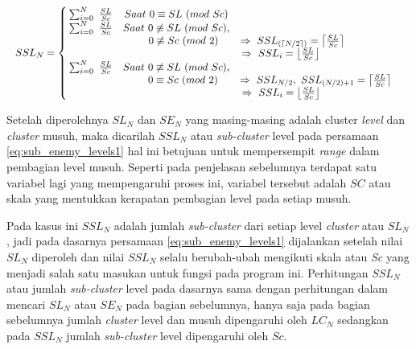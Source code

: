 \begin{equation}\label{eq:sub_enemy_levels1}
\resizebox{\columnwidth}{!}{%
	$SSL_{N} = \left\{\begin{matrix}
	\hspace{0.2em} \sum_{i = 0}^{N}\ \frac{SL}{Sc} & Saat\ 0 \equiv SL\ (mod\ Sc) & \\
	
	\hspace{0.2em} \sum_{i = 0}^{N}\ \frac{SL}{Sc} & Saat\ 0 \not\equiv SL\ (mod\ Sc), & \\
	&\hspace{1.4em}  0 \not\equiv Sc\ (mod\ 2) & \hspace{-4.5em} \Rightarrow\ SSL_{(\left \lceil N/2 \right \rceil)}  = \left \lceil \frac{SL}{Sc} \right \rceil &\\
	
	& & \hspace{-6.8em} \Rightarrow\ SSL_{i}  = \left \lfloor \frac{SL}{Sc} \right \rfloor &\\
	
	\hspace{0.2em} \sum_{i = 0}^{N}\ \frac{SL}{Sc} & Saat\ 0 \not\equiv SL\ (mod\ Sc), & \\
	&\hspace{1.3em}  0 \equiv Sc\ (mod\ 2) & \Rightarrow\ SSL_{N/2},\ SSL_{(N/2) + 1}  = \left \lceil \frac{SL}{Sc} \right \rceil &\\
	
	& & \hspace{-6.7em} \Rightarrow\ SSL_{i}  = \left \lfloor \frac{SL}{Sc} \right \rfloor &\\
	\end{matrix}\right.$%
}
\end{equation}

Setelah diperolehnya $SL_{N}$ dan $SE_{N}$ yang masing-masing adalah cluster \textit{level} dan \textit{cluster} musuh, maka dicarilah $SSL_{N}$ atau \textit{sub-cluster} level pada persamaan \ref{eq:sub_enemy_levels1} hal ini betujuan untuk mempersempit \textit{range} dalam pembagian level musuh. Seperti pada penjelasan sebelumnya terdapat satu variabel lagi yang mempengaruhi proses ini, variabel tersebut adalah $SC$ atau skala yang mentukkan kerapatan pembagian level pada setiap musuh. 
\vspace{1ex}

Pada kasus ini $SSL_{N}$ adalah jumlah \textit{sub-cluster} dari setiap level \textit{cluster} atau $SL_{N}$, jadi pada dasarnya persamaan \ref{eq:sub_enemy_levels1} dijalankan setelah nilai $SL_{N}$ diperoleh dan nilai $SSL_{N}$ selalu berubah-ubah mengikuti skala atau \textit{Sc} yang menjadi salah satu masukan untuk fungsi pada program ini. Perhitungan $SSL_{N}$ atau jumlah \textit{sub-cluster} level pada dasarnya sama dengan perhitungan dalam mencari $SL_{N}$ atau $SE_{N}$ pada bagian sebelumnya, hanya saja pada bagian sebelumnya jumlah \textit{cluster} level dan musuh dipengaruhi oleh $LC_{N}$ sedangkan pada $SSL_{N}$ jumlah \textit{sub-cluster} level dipengaruhi oleh $Sc$.
\vspace{1ex}

